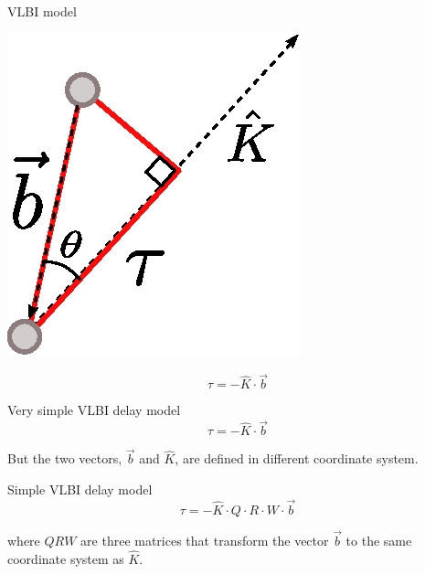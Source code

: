 \documentclass[14pt,table,t, c]{beamer}
\begin{document}
\begin{frame}{VLBI model}
\begin{minipage}[t][][c]{0.40\linewidth}
	\includegraphics[width=\linewidth]{figure/vlbi_simple}
\end{minipage}
\begin{minipage}[t][][c]{0.5\linewidth}
\vspace{2cm}
\Huge
\begin{equation*}
\tau = - \hat{K} \cdot \vec{b} 
\end{equation*}
\end{minipage}
\end{frame}

\begin{frame}
\begin{block}{Very simple VLBI delay model}
\vspace{-\baselineskip}\setlength\belowdisplayshortskip{0pt}
\begin{equation*}
\tau = - \hat{K} \cdot \vec{b} 
\end{equation*}
\end{block}

But the two vectors, $\vec{b}$ and $\hat{K}$, are defined in different coordinate system. 
\vfill
\pause
\begin{block}{Simple VLBI delay model}
\vspace{-\baselineskip}\setlength\belowdisplayshortskip{0pt}
\begin{equation*}
\tau = - \hat{K} \cdot Q \cdot R \cdot W \cdot \vec{b} 
\end{equation*}
\end{block}
where $QRW$ are three matrices that transform the vector $\vec{b}$ to the same coordinate system as $\hat{K}$.
\end{frame}
\end{document}
